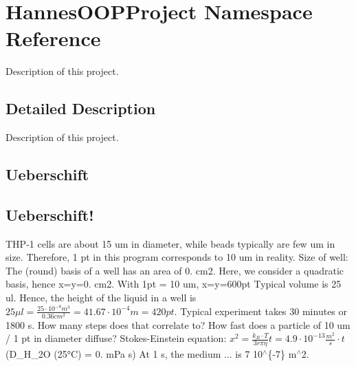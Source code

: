 \hypertarget{namespace_hannes_o_o_p_project}{}\section{Hannes\+O\+O\+P\+Project Namespace Reference}
\label{namespace_hannes_o_o_p_project}


Description of this project.  




\subsection{Detailed Description}
Description of this project. 

\subsection*{Ueberschift }

\subsection*{Ueberschift! }

T\+H\+P-\/1 cells are about 15 um in diameter, while beads typically are few um in size. Therefore, 1 pt in this program corresponds to 10 um in reality. Size of well\+: The (round) basis of a well has an area of 0. cm2. Here, we consider a quadratic basis, hence x=y=0. cm2. With 1pt = 10 um, x=y=600pt Typical volume is 25 ul. Hence, the height of the liquid in a well is $ 25 \mu l = \frac{25 \cdot 10^{-8} m^3}{0.36 cm^2} = 41.67 \cdot 10^{-4} m = 420 pt $. Typical experiment takes 30 minutes or 1800 s. How many steps does that correlate to? How fast does a particle of 10 um / 1 pt in diameter diffuse? Stokes-\/\+Einstein equation\+: $ x^2 = \frac{k_B \cdot T}{3r \pi \eta} t = 4.9 \cdot 10^{-13} \frac{m^2}{s} \cdot t $ (D\+\_\+\+H\+\_\+2O (25°C) = 0. m\+Pa  s) At 1 s, the medium ... is 7  10$^\wedge$\{-\/7\} m$^\wedge$2. 